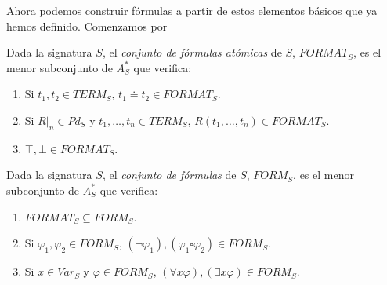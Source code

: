 Ahora podemos construir fórmulas a partir de estos elementos básicos que ya hemos definido. Comenzamos por 

\begin{definition}
Dada la signatura $S$, el \textit{conjunto de fórmulas atómicas} de $S$, $FORMAT_S$, es el menor subconjunto de $A_{S}^*$ que verifica:
\begin{enumerate}
    \item Si $t_1, t_2 \in TERM_S$, $t_1 \doteq t_2 \in FORMAT_S$.
    \item Si $R|_{n} \in Pd_S$ y $t_1, \dots, t_n \in TERM_S$, $R(t_1, \dots, t_n) \in FORMAT_S$.
    \item $\top, \bot \in FORMAT_S$.
\end{enumerate}
\end{definition}

\begin{definition}
Dada la signatura $S$, el \textit{conjunto de fórmulas} de $S$, $FORM_S$, es el menor subconjunto de $A_{S}^*$ que verifica:
\begin{enumerate}
    \item $FORMAT_S \subseteq FORM_S$.
    \item Si $\varphi_1, \varphi_2 \in FORM_S$, $(\neg \varphi_1), (\varphi_1 \square \varphi_2) \in FORM_S$.
    \item Si $x \in Var_S$ y $\varphi \in FORM_S$, $(\forall x \varphi), (\exists x \varphi) \in FORM_S$. 
\end{enumerate}
\end{definition}
    
    